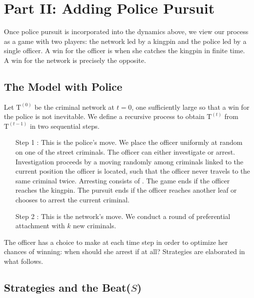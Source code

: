 \documentclass[11pt]{article}
\renewcommand{\t }[1]{\mathrm{#1}}
\theoremstyle{plain}
\theoremstyle{definition}
\begin{document}
\section*{Part II: Adding Police Pursuit}

Once police pursuit is incorporated into the dynamics above, we view our process as a game with two players: the network led by a kingpin and the police led by a single officer.  A win for the officer is when she catches the kingpin in finite time.  A win for the network is precisely the opposite.

\subsection*{The Model with Police}
Let $\t T^{(0)}$ be the criminal network at $t =0$, one sufficiently large so that a win for the police is not inevitable.  We define a recursive process to obtain $\t T^{(t)}$ from $\t T^{(t-1)}$ in two sequential steps.
\begin{changemargin}{15mm}{15mm}
\begin{enumerate}
[label=(\arabic*)]
 \item[Step 1 :]  This is the police's move.  We place the officer uniformly at random on one of the street criminals.  The officer can either investigate or arrest.  Investigation proceeds by a moving randomly among criminals linked to the current position the officer is located, such that the officer never travels to the same criminal twice.  Arresting consists of .  The game ends if the officer reaches the kingpin.  The pursuit ends if the officer reaches another leaf or chooses to arrest the current criminal.
\item[ Step 2 :] This is the network's move.  We conduct a round of preferential attachment with $k$ new criminals.
\end{enumerate}
\end{changemargin}
The officer has a choice to make at each time step in order to optimize her chances of winning: when should she arrest if at all?  Strategies are elaborated in what follows. 

\subsection*{Strategies and the Beat($S$)}
\end{document}
